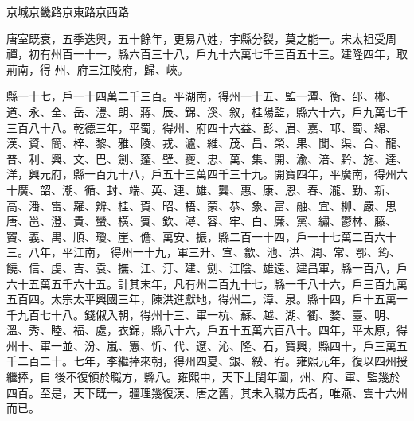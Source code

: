 
\begin{pinyinscope}

 京城京畿路京東路京西路



 唐室既衰，五季迭興，五十餘年，更易八姓，宇縣分裂，莫之能一。宋太祖受周禪，初有州百一十一，縣六百三十八，戶九十六萬七千三百五十三。建隆四年，取荊南，得
 州、府三江陵府，歸、峽。



 縣一十七，戶一十四萬二千三百。平湖南，得州一十五、監一潭、衡、邵、郴、道、永、全、岳、澧、朗、蔣、辰、錦、溪、敘，桂陽監，縣六十六，戶九萬七千三百八十八。乾德三年，平蜀，得州、府四十六益、彭、眉、嘉、邛、蜀、綿、漢、資、簡、梓、黎、雅、陵、戎、瀘、維、茂、昌、榮、果、閬、渠、合、龍、普、利、興、文、巴、劍、蓬、壁、夔、忠、萬、集、開、渝、涪、黔、施、達、洋，興元府，縣一百九十八，戶五十三萬四千三十九。開寶四年，平廣南，得州六十廣、韶、潮、循、封、端、英、連、雄、龔、惠、康、恩、春、瀧、勤、新、高、潘、雷、羅、辨、桂、賀、昭、梧、蒙、恭、象、富、融、宜、柳、嚴、思唐、邕、澄、貴、蠻、橫、賓、欽、潯、容、牢、白、廉、黨、繡、鬱林、藤、竇、義、禺、順、瓊、崖、儋、萬安、振，縣二百一十四，戶一十七萬二百六十三。八年，平江南，
 得州一十九，軍三升、宣、歙、池、洪、潤、常、鄂、筠、饒、信、虔、吉、袁、撫、江、汀、建、劍、江陰、雄遠、建昌軍，縣一百八，戶六十五萬五千六十五。計其末年，凡有州二百九十七，縣一千八十六，戶三百九萬五百四。太宗太平興國三年，陳洪進獻地，得州二，漳、泉。縣十四，戶十五萬一千九百七十八。錢俶入朝，得州十三、軍一杭、蘇、越、湖、衢、婺、臺、明、溫、秀、睦、福、處，衣錦，縣八十六，戶五十五萬六百八十。四年，平太原，得州十、軍一並、汾、嵐、憲、忻、代、遼、沁、隆、石，寶興，縣四十，戶三萬五千二百二十。七年，李繼捧來朝，得州四夏、銀、綏、宥。雍熙元年，復以四州授繼捧，自
 後不復領於職方，縣八。雍熙中，天下上閏年圖，州、府、軍、監幾於四百。至是，天下既一，疆理幾復漢、唐之舊，其未入職方氏者，唯燕、雲十六州而已。




\end{pinyinscope}
